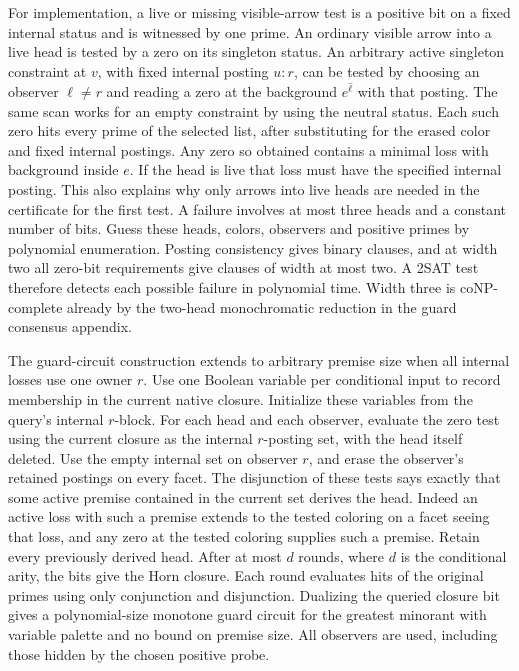 For implementation, a live or missing visible-arrow
test is a positive bit on a fixed internal status and is
witnessed by one prime. An ordinary visible arrow into a
live head is tested by a zero on its singleton status.
An arbitrary active singleton constraint at $v$, with
fixed internal posting $u:r$, can be tested by choosing
an observer $\ell\ne r$ and reading a zero at the
background $e^{\widehat\ell}$ with that posting.
The same scan works for an empty constraint by using the
neutral status. Each such zero hits every prime of the
selected list, after substituting for the erased color
and fixed internal postings. Any zero so obtained
contains a minimal loss with background inside $e$.
If the head is live that loss must have the specified
internal posting. This also explains why only arrows
into live heads are needed in the certificate for the
first test. A failure involves at most three heads and
a constant number of bits. Guess these heads, colors,
observers and positive primes by polynomial enumeration.
Posting consistency gives binary clauses, and at width
two all zero-bit requirements give clauses of width at
most two. A 2SAT test therefore detects each possible
failure in polynomial time. Width three is coNP-complete
already by the two-head monochromatic reduction in the
guard consensus appendix.

The guard-circuit construction extends to
arbitrary premise size when all internal losses
use one owner $r$. Use one Boolean variable
per conditional input to record membership
in the current native closure. Initialize
these variables from the query's internal
$r$-block. For each head and each observer,
evaluate the zero test using the current
closure as the internal $r$-posting set, with
the head itself deleted. Use the empty
internal set on observer $r$, and erase the
observer's retained postings on every facet.
The disjunction of these tests says exactly
that some active premise contained in the
current set derives the head. Indeed an active
loss with such a premise extends to the tested
coloring on a facet seeing that loss, and any
zero at the tested coloring supplies such a
premise. Retain every previously derived head.
After at most $d$ rounds, where $d$ is the
conditional arity, the bits give the Horn
closure. Each round evaluates hits of the
original primes using only conjunction and
disjunction. Dualizing the queried closure
bit gives a polynomial-size monotone guard
circuit for the greatest minorant with
variable palette and no bound on premise
size. All observers are used, including those
hidden by the chosen positive probe.

